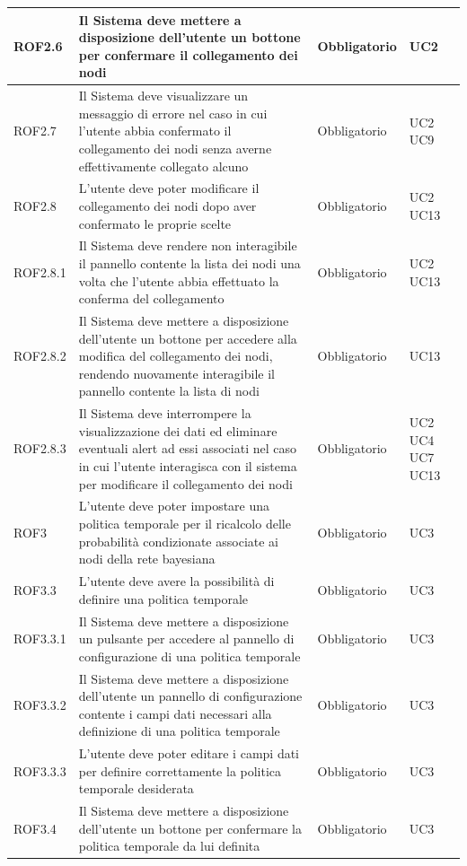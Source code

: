 \begin{center}
\begin{longtable}[c]{|m{}|m{}|m{}|m{}|}
\hline
\rowcolor{grigio}ROF2.6 & Il Sistema deve mettere a disposizione dell'utente un bottone per confermare il collegamento dei nodi & Obbligatorio & UC2\\
\hline
ROF2.7 & Il Sistema deve visualizzare un messaggio di errore nel caso in cui l'utente abbia confermato il collegamento dei nodi senza averne effettivamente collegato alcuno & Obbligatorio & UC2 UC9\\
\hline
\rowcolor{grigio}ROF2.8 & L'utente deve poter modificare il collegamento dei nodi dopo aver confermato le proprie scelte & Obbligatorio & UC2 UC13\\
\hline
ROF2.8.1 & Il Sistema deve rendere non interagibile il pannello contente la lista dei nodi una volta che l'utente abbia effettuato la conferma del collegamento & Obbligatorio & UC2 UC13\\
\hline
\rowcolor{grigio}ROF2.8.2 & Il Sistema deve mettere a disposizione dell'utente un bottone per accedere alla modifica del collegamento dei nodi, rendendo nuovamente interagibile il pannello contente la lista di nodi & Obbligatorio & UC13\\
\hline
ROF2.8.3 & Il Sistema deve interrompere la visualizzazione dei dati ed eliminare eventuali alert ad essi associati nel caso in cui l'utente interagisca con il sistema per modificare il collegamento dei nodi & Obbligatorio & UC2 UC4 UC7 UC13\\
\hline
\rowcolor{grigio}ROF3 & L'utente deve poter impostare una politica temporale per il ricalcolo delle probabilità condizionate associate ai nodi della rete bayesiana & Obbligatorio & UC3\\
\hline
ROF3.3 & L'utente deve avere la possibilità di definire una politica temporale & Obbligatorio & UC3\\ 
\hline
\rowcolor{grigio}ROF3.3.1 & Il Sistema deve mettere a disposizione un pulsante per accedere al pannello di configurazione di una politica temporale & Obbligatorio & UC3\\
\hline
ROF3.3.2 & Il Sistema deve mettere a disposizione dell'utente un pannello di configurazione contente i campi dati necessari alla definizione di una politica temporale & Obbligatorio & UC3\\
\hline
\rowcolor{grigio}ROF3.3.3 & L'utente deve poter editare i campi dati per definire correttamente la politica temporale desiderata & Obbligatorio & UC3\\
\hline
ROF3.4 & Il Sistema deve mettere a disposizione dell'utente un bottone per confermare la politica temporale da lui definita & Obbligatorio & UC3\\

\end{longtable}
\end{center}
